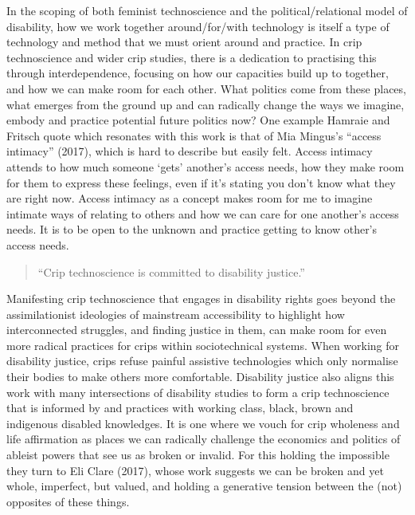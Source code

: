 In the scoping of both feminist technoscience and the
political/relational model of disability, how we work together
around/for/with technology is itself a type of technology and method
that we must orient around and practice. In crip technoscience and wider
crip studies, there is a dedication to practising this through
interdependence, focusing on how our capacities build up to together,
and how we can make room for each other. What politics come from these
places, what emerges from the ground up and can radically change the
ways we imagine, embody and practice potential future politics now? One
example Hamraie and Fritsch quote which resonates with this work is that
of Mia Mingus's ``access intimacy'' (2017), which is hard to describe
but easily felt. Access intimacy attends to how much someone `gets'
another's access needs, how they make room for them to express these
feelings, even if it's stating you don't know what they are right now.
Access intimacy as a concept makes room for me to imagine intimate ways
of relating to others and how we can care for one another's access
needs. It is to be open to the unknown and practice getting to know
other's access needs.

\begin{quote}
``Crip technoscience is committed to disability justice.''
\end{quote}

Manifesting crip technoscience that engages in disability rights goes
beyond the assimilationist ideologies of mainstream accessibility to
highlight how interconnected struggles, and finding justice in them, can
make room for even more radical practices for crips within
sociotechnical systems. When working for disability justice, crips
refuse painful assistive technologies which only normalise their bodies
to make others more comfortable. Disability justice also aligns this
work with many intersections of disability studies to form a crip
technoscience that is informed by and practices with working class,
black, brown and indigenous disabled knowledges. It is one where we
vouch for crip wholeness and life affirmation as places we can radically
challenge the economics and politics of ableist powers that see us as
broken or invalid. For this holding the impossible they turn to Eli
Clare (2017), whose work suggests we can be broken and yet whole,
imperfect, but valued, and holding a generative tension between the
(not) opposites of these things.

